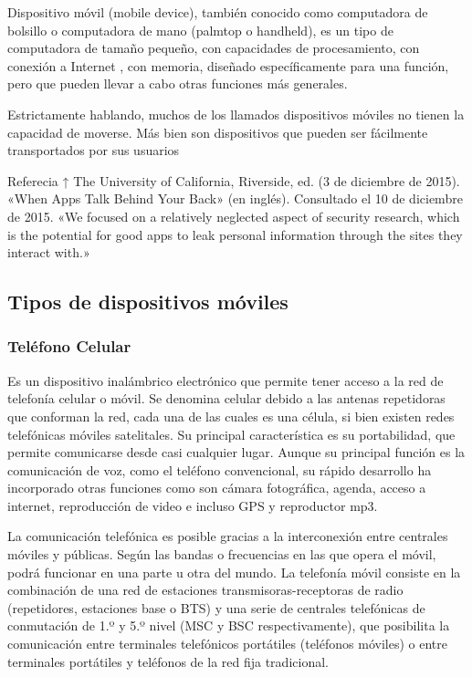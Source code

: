 Dispositivo móvil (mobile device), también conocido como computadora de bolsillo o computadora de mano (palmtop o handheld), es un tipo de computadora de tamaño pequeño, con capacidades de procesamiento, con conexión a Internet , con memoria, diseñado específicamente para una función, pero que pueden llevar a cabo otras funciones más generales.

Estrictamente hablando, muchos de los llamados dispositivos móviles no tienen la capacidad de moverse. Más bien son dispositivos que pueden ser fácilmente transportados por sus usuarios


Referecia
↑ The University of California, Riverside, ed. (3 de diciembre de 2015). «When Apps Talk Behind Your Back» (en inglés). Consultado el 10 de diciembre de 2015. «We focused on a relatively neglected aspect of security research, which is the potential for good apps to leak personal information through the sites they interact with.»

\subsection{Tipos de dispositivos móviles}

\subsubsection{Teléfono Celular} 

Es un dispositivo inalámbrico electrónico que permite tener acceso a la red de telefonía celular o móvil. Se denomina celular debido a las antenas repetidoras que conforman la red, cada una de las cuales es una célula, si bien existen redes telefónicas móviles satelitales. Su principal característica es su portabilidad, que permite comunicarse desde casi cualquier lugar. Aunque su principal función es la comunicación de voz, como el teléfono convencional, su rápido desarrollo ha incorporado otras funciones como son cámara fotográfica, agenda, acceso a internet, reproducción de video e incluso GPS y reproductor mp3.

La comunicación telefónica es posible gracias a la interconexión entre centrales móviles y públicas. Según las bandas o frecuencias en las que opera el móvil, podrá funcionar en una parte u otra del mundo. La telefonía móvil consiste en la combinación de una red de estaciones transmisoras-receptoras de radio (repetidores, estaciones base o BTS) y una serie de centrales telefónicas de conmutación de 1.º y 5.º nivel (MSC y BSC respectivamente), que posibilita la comunicación entre terminales telefónicos portátiles (teléfonos móviles) o entre terminales portátiles y teléfonos de la red fija tradicional.

